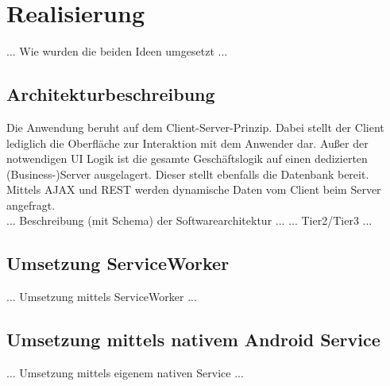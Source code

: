 \section{Realisierung}

... Wie wurden die beiden Ideen umgesetzt ...

\subsection{Architekturbeschreibung}

Die Anwendung beruht auf dem Client-Server-Prinzip. Dabei stellt der Client lediglich die Oberfläche zur Interaktion mit dem Anwender dar. Außer der notwendigen UI Logik ist die gesamte Geschäftslogik auf einen dedizierten (Business-)Server ausgelagert. Dieser stellt ebenfalls die Datenbank bereit. Mittels AJAX und REST werden dynamische Daten vom Client beim Server angefragt.\\

... Beschreibung (mit Schema) der Softwarearchitektur ...
... Tier2/Tier3 ...

\subsection{Umsetzung ServiceWorker}

... Umsetzung mittels ServiceWorker ...

\subsection{Umsetzung mittels nativem Android Service}

... Umsetzung mittels eigenem nativen Service ...